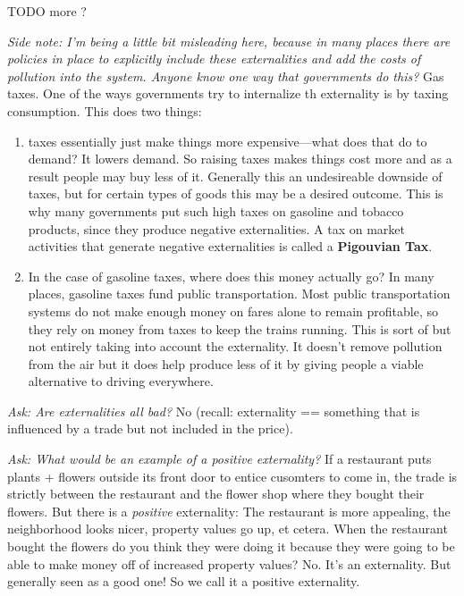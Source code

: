 \documentclass[11pt]{article}
\begin{document}
TODO more ?




{\it Side note: I'm being a little bit misleading here, because in many places there are policies in place to explicitly include these externalities and add the costs of pollution into the system. Anyone know one way that governments do this?} Gas taxes. One of the ways governments try to internalize th externality is by taxing consumption. This does two things: 
\begin{enumerate}
    \item taxes essentially just make things more expensive---what does that do to demand? It lowers demand. So raising taxes makes things cost more and as a result people may buy less of it. Generally this an undesireable downside of taxes, but for certain types of goods this may be a desired outcome. This is why many governments put such high taxes on gasoline and tobacco products, since they produce negative externalities. A tax on market activities that generate negative externalities is called a {\bf Pigouvian Tax}.
    \item In the case of gasoline taxes, where does this money actually go? In many places, gasoline taxes fund public transportation. Most public transportation systems do not make enough money on fares alone to remain profitable, so they rely on money from taxes to keep the trains running. This is sort of but not entirely taking into account the externality. It doesn't remove pollution from the air but it does help produce less of it by giving people a viable alternative to driving everywhere.
\end{enumerate}

{\it Ask: Are externalities all bad?} No (recall: externality == something that is influenced by a trade but not included in the price).

{\it Ask: What would be an example of a positive externality?} If a restaurant puts plants + flowers outside its front door to entice cusomters to come in, the trade is strictly between the restaurant and the flower shop where they bought their flowers. But there is a {\it positive} externality: The restaurant is more appealing, the neighborhood looks nicer, property values go up, et cetera. When the restaurant bought the flowers do you think they were doing it because they were going to be able to make money off of increased property values? No. It's an externality. But generally seen as a good one! So we call it a positive externality.
\end{document}
